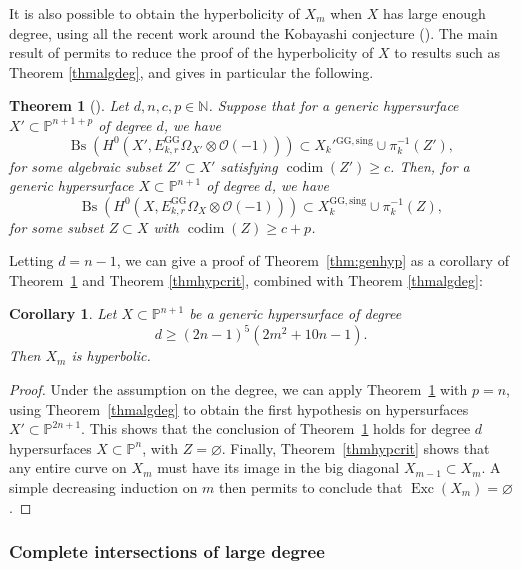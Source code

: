 \documentclass[JEP,XML,SOM,Unicode, NoEqCountersInSection,NoFloatCountersInSection,published]{cedram}
\let\mathcal\mathscr
\newcommand{\rGG}{\mathrm{GG}}
\newcommand{\sing}{\mathrm{sing}}
\DeclareMathOperator{\Bs}{Bs}
\DeclareMathOperator{\codim}{codim}
\DeclareMathOperator{\Exc}{Exc}
\theoremstyle{theorem}
\newtheorem{theorem}{Theorem}
\newtheorem{corollary}[proposition]{Corollary}
\theoremstyle{definition}
\def\bP{{\mathbb P}}
\begin{document}
It is also possible to obtain the hyperbolicity of $X_m$ when $X$ has large enough degree, using all the recent work around the Kobayashi conjecture (\cf \cite{bro17, den17, dem18, RY18}). The main result of \cite{RY18} permits to reduce the proof of the hyperbolicity of $X$ to results such as Theorem \ref{thmalgdeg}, and gives in particular the following.

\begin{theorem}[\cite{RY18}] \label{thm:RY18} Let $d, n, c, p \in \mathbb N$. Suppose that for a generic hypersurface $X' \subset \mathbb P^{n+1+p}$ of degree $d$, we have
\[
\Bs \left( H^0(X', E_{k,r}^{\rGG} \Omega_{X'} \otimes \mathcal O(-1)) \right) \subset X_k'{}^{\rGG, \sing} \cup \pi_k^{-1} (Z'),
\]
for some algebraic subset $Z' \subset X'$ satisfying $\codim(Z') \geq c$. Then, for a generic hypersurface $X \subset \mathbb P^{n+1}$ of degree $d$, we have
\[
\Bs \left( H^0(X, E_{k,r}^{\rGG} \Omega_{X} \otimes \mathcal O(-1)) \right) \subset X_k^{\rGG, \sing} \cup \pi_k^{-1} (Z),
\]
for some subset $Z \subset X$ with $\codim(Z) \geq c + p$.
\end{theorem}

Letting $d = n - 1$, we can give a proof of Theorem~\ref{thm:genhyp} as a corollary of Theorem~\ref{thm:RY18} and Theorem \ref{thmhypcrit}, combined with Theorem \ref{thmalgdeg}:

\begin{corollary} \label{corolhypsurf}
Let $X \subset \mathbb P^{n+1}$ be a generic hypersurface of degree
\[
d \geq (2n - 1)^5 (2m^2 + 10 n - 1).
\]
Then $X_m$ is hyperbolic.
\end{corollary}
\begin{proof}
Under the assumption on the degree, we can apply Theorem~\ref{thm:RY18} with \(p = n\), using Theorem~\ref{thmalgdeg} to obtain the first hypothesis on hypersurfaces \(X' \subset \bP^{2n+1}\). This shows that the conclusion of Theorem~\ref{thm:RY18} holds for degree \(d\) hypersurfaces \(X \subset \bP^{n}\), with \(Z = \varnothing\). Finally, Theorem~\ref{thmhypcrit} shows that any entire curve on \(X_{m}\) must have its image in the big diagonal \(X_{m-1} \subset X_{m}\). A simple decreasing induction on \(m\) then permits to conclude that \(\Exc(X_{m}) = \varnothing\).
\end{proof}

\subsubsection{Complete intersections of large degree}
\end{document}
